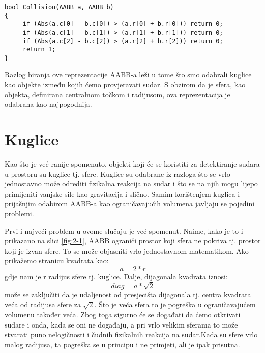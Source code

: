 \begin{lstlisting}[style={myC++},label={code:6},caption={Provjeravanje sudara za centar-radijus reprezentaciju AABB-a\cite{1}}]
bool Collision(AABB a, AABB b)
{
	 if (Abs(a.c[0] - b.c[0]) > (a.r[0] + b.r[0])) return 0;
	 if (Abs(a.c[1] - b.c[1]) > (a.r[1] + b.r[1])) return 0;
	 if (Abs(a.c[2] - b.c[2]) > (a.r[2] + b.r[2])) return 0;
	 return 1;
}
\end{lstlisting}

Razlog biranja ove reprezentacije AABB-a leži u tome što smo odabrali kuglice kao objekte između kojih ćemo provjeravati sudar. S obzirom da je sfera, kao objekta, definirana centralnom točkom i radijusom, ova reprezentacija je odabrana kao najpogodnija.

\section{Kuglice}\label{sec:balls}

Kao što je već ranije spomenuto, objekti koji će se koristiti za detektiranje sudara u prostoru su kuglice tj. sfere. Kuglice su odabrane iz razloga što se vrlo jednostavno može odrediti fizikalna reakcija na sudar i što se na njih mogu lijepo primijeniti vanjske sile kao gravitacija i slično. Samim korištenjem kuglica i prijašnjim odabirom AABB-a kao ograničavajućih volumena javljaju se pojedini problemi.

Prvi i najveći problem u ovome slučaju je već spomenut. Naime, kako je to i prikazano na slici \ref{fig:2-1}, AABB ograniči prostor koji sfera ne pokriva tj. prostor koji je izvan sfere. To se može objasniti vrlo jednostavnom matematikom. Ako prikažemo stranicu kvadrata kao:
\begin{equation}
a = 2*r \label{eq:stranica}
\end{equation}
gdje nam je r radijus sfere tj. kuglice. Dalje, dijagonala kvadrata iznosi:
\begin{equation}
diag = a * \sqrt{2} \label{eq:dijagonala}
\end{equation}
može se zaključiti da je udaljenost od presjecišta dijagonala tj. centra kvadrata veća od radijusa sfere za $\sqrt{2}$. Što je veća sfera to je pogreška u ograničavajućem volumenu također veća. Zbog toga sigurno će se događati da ćemo otkrivati sudare i onda, kada se oni ne događaju, a pri vrlo velikim sferama to može stvarati puno nelogičnosti i čudnih fizikalnih reakcija na sudar.Kada su sfere vrlo malog radijusa, ta pogreška se u principu i ne primjeti, ali je ipak prisutna.

